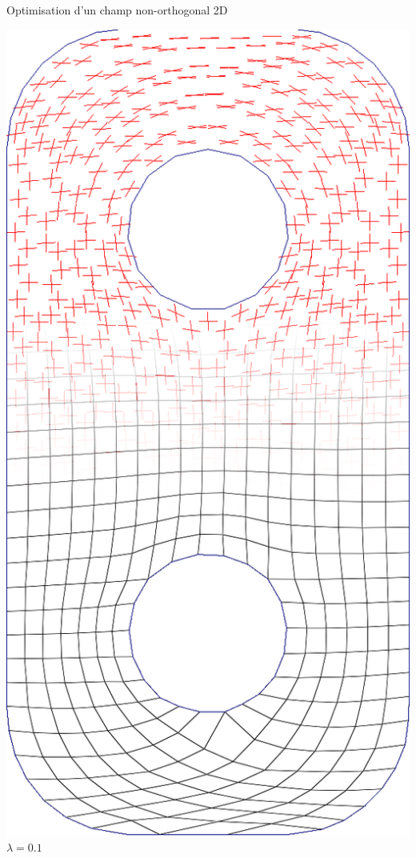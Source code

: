 \begin{frame}{Optimisation d'un champ non-orthogonal 2D}
\begin{minipage}[b]{0.15\textwidth}
        \includegraphics[width=\textwidth]{img_spm_ff/perced_1}
        $\lambda = 0.1$
    \end{minipage}
    \ \ \ 
    \begin{minipage}[b]{0.15\textwidth}

\end{minipage}
\end{frame}
